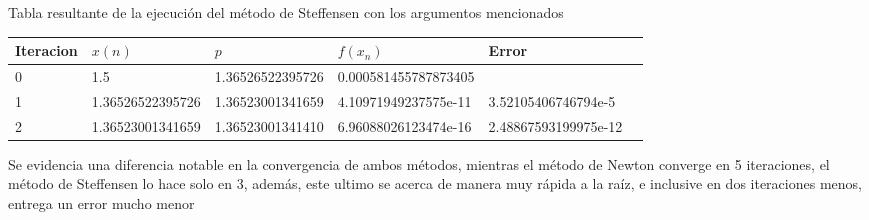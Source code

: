 \documentclass[12pt]{article}
\begin{document}
Tabla resultante de la ejecución del método de Steffensen con los argumentos mencionados
\begin{center}
	\begin{tabular}{|l|l|l|l|l|l|} \hline
	Iteracion & $x(n)$ & $p$ & $f(x_{n})$ & Error \\
	\hline \hline
	0 & 1.5 & 1.36526522395726 & 0.000581455787873405 & \\ 
	\hline 
	1 & 1.36526522395726 & 1.36523001341659 & 4.10971949237575e-11 & 3.52105406746794e-5 \\
	\hline
	2 & 1.36523001341659 & 1.36523001341410 & 6.96088026123474e-16  & 2.48867593199975e-12 \\
	\hline
	\end{tabular}
\end{center}

Se evidencia una diferencia notable en la convergencia de ambos métodos, mientras
el método de Newton converge en 5 iteraciones, el método de Steffensen lo hace solo en 3, además, este ultimo se acerca de manera muy
rápida a la raíz, e inclusive en dos iteraciones menos, entrega un error mucho menor
\end{document}
